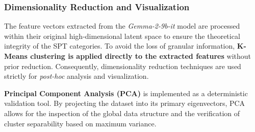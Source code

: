 \subsubsection{Dimensionality Reduction and Visualization}





The feature vectors extracted from the \textit{Gemma-2-9b-it} model are processed within their original high-dimensional latent space to ensure the theoretical integrity of the SPT categories. To avoid the loss of granular information, \textbf{K-Means clustering is applied directly to the extracted features} without prior reduction. Consequently, dimensionality reduction techniques are used strictly for \textit{post-hoc} analysis and visualization.

\textbf{Principal Component Analysis (PCA)} is implemented as a deterministic validation tool. By projecting the dataset into its primary eigenvectors, PCA allows for the inspection of the global data structure and the verification of cluster separability based on maximum variance.

